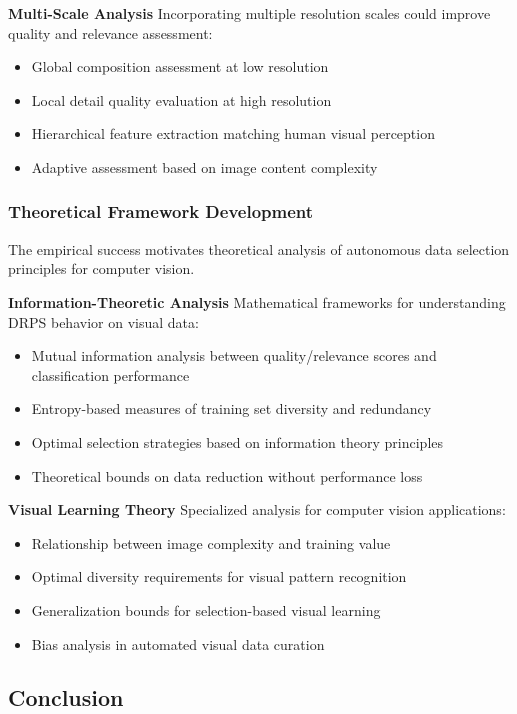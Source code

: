 \documentclass[12pt]{article}
\begin{document}
\textbf{Multi-Scale Analysis}
Incorporating multiple resolution scales could improve quality and relevance assessment:
\begin{itemize}
\item Global composition assessment at low resolution
\item Local detail quality evaluation at high resolution
\item Hierarchical feature extraction matching human visual perception
\item Adaptive assessment based on image content complexity
\end{itemize}

\subsubsection{Theoretical Framework Development}\label{theoretical-development}

The empirical success motivates theoretical analysis of autonomous data selection principles for computer vision.

\textbf{Information-Theoretic Analysis}
Mathematical frameworks for understanding DRPS behavior on visual data:
\begin{itemize}
\item Mutual information analysis between quality/relevance scores and classification performance
\item Entropy-based measures of training set diversity and redundancy
\item Optimal selection strategies based on information theory principles
\item Theoretical bounds on data reduction without performance loss
\end{itemize}

\textbf{Visual Learning Theory}
Specialized analysis for computer vision applications:
\begin{itemize}
\item Relationship between image complexity and training value
\item Optimal diversity requirements for visual pattern recognition
\item Generalization bounds for selection-based visual learning
\item Bias analysis in automated visual data curation
\end{itemize}

\subsection{Conclusion}\label{conclusion}
\end{document}
